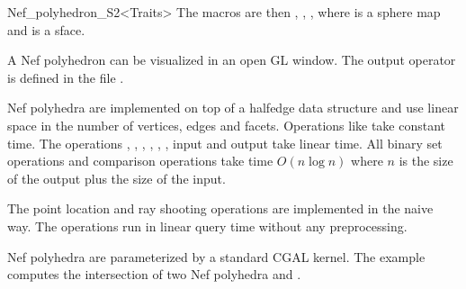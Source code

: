 \begin{ccRefClass}{Nef_polyhedron_S2<Traits>}
The macros are then ,
, ,
 where  is a sphere map
and  is a sface.

 A Nef polyhedron  can be
visualized in an open GL window. The output operator is defined in the
file .
   
\ccImplementation

Nef polyhedra are implemented on top of a halfedge data structure and
use linear space in the number of vertices, edges and facets.
Operations like  take constant time. The operations
, , , ,
, , input and output take linear
time. All binary set operations and comparison operations take time
$O(n \log n)$ where $n$ is the size of the output plus the size of the
input.

The point location and ray shooting operations are implemented in the
naive way. The operations run in linear query time without any
preprocessing.

\ccExample

Nef polyhedra are parameterized by a standard CGAL kernel. The example
computes the intersection of two Nef polyhedra  and .


\end{ccRefClass}


